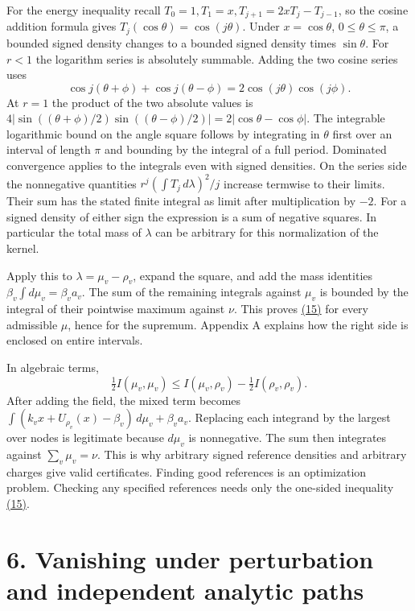 \documentclass[11pt,a4paper]{article}
\begin{document}
For the energy inequality recall \(T_0=1,T_1=x,T_{j+1}=2xT_j-T_{j-1}\), so the cosine addition formula gives \(T_j(\cos\theta)=\cos(j\theta)\). Under \(x=\cos\theta\), \(0\le\theta\le\pi\), a bounded signed density changes to a bounded signed density times \(\sin\theta\). For \(r<1\) the logarithm series is absolutely summable. Adding the two cosine series uses \[
 \cos j(\theta+\phi)+\cos j(\theta-\phi)=2\cos(j\theta)\cos(j\phi).
\] At \(r=1\) the product of the two absolute values is \(4|\sin((\theta+\phi)/2)\sin((\theta-\phi)/2)|=2|\cos\theta-\cos\phi|\). The integrable logarithmic bound on the angle square follows by integrating in \(\theta\) first over an interval of length \(\pi\) and bounding by the integral of a full period. Dominated convergence applies to the integrals even with signed densities. On the series side the nonnegative quantities \(r^j(\int T_j\,d\lambda)^2/j\) increase termwise to their limits. Their sum has the stated finite integral as limit after multiplication by \(-2\). For a signed density of either sign the expression is a sum of negative squares. In particular the total mass of \(\lambda\) can be arbitrary for this normalization of the kernel.

Apply this to \(\lambda=\mu_v-\rho_v\), expand the square, and add the mass identities \(\beta_v\int d\mu_v=\beta_va_v\). The sum of the remaining integrals against \(\mu_v\) is bounded by the integral of their pointwise maximum against \(\nu\). This proves \hyperref[eq:15]{(15)} for every admissible \(\mu\), hence for the supremum. Appendix A explains how the right side is enclosed on entire intervals.

In algebraic terms, \[
 \tfrac12 I(\mu_v,\mu_v)\le I(\mu_v,\rho_v)-\tfrac12 I(\rho_v,\rho_v).
\] After adding the field, the mixed term becomes \(\int(k_vx+U_{\rho_v}(x)-\beta_v)\,d\mu_v+\beta_va_v\). Replacing each integrand by the largest over nodes is legitimate because \(d\mu_v\) is nonnegative. The sum then integrates against \(\sum_v\mu_v=\nu\). This is why arbitrary signed reference densities and arbitrary charges give valid certificates. Finding good references is an optimization problem. Checking any specified references needs only the one-sided inequality \hyperref[eq:15]{(15)}.

\section{6. Vanishing under perturbation and independent analytic paths}\label{vanishing-under-perturbation-and-independent-analytic-paths}
\end{document}

